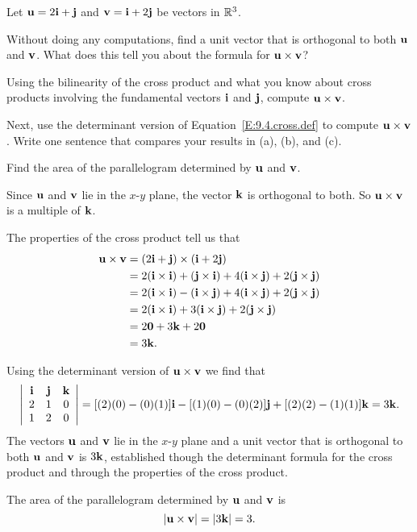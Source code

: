 \begin{exercises} 

\item \label{Ez:9.4.1}    Let $\mathbf{u} = 2\mathbf{i} + \mathbf{j}$ and $\mathbf{v} = \mathbf{i} + 2\mathbf{j}$ be vectors in $\mathbb{R}^3$.
    \ba
	    \item Without doing any computations, find a unit vector that is orthogonal to both $\mathbf{u}$ and $\mathbf{v}$.  What does this tell you about the formula for $\mathbf{u} \times \mathbf{v}$?
	    \item Using the bilinearity of the cross product and what you know about cross products involving the fundamental vectors $\mathbf{i}$ and $\mathbf{j}$, compute $\mathbf{u} \times \mathbf{v}$.
	    \item Next, use the determinant version of Equation~\eqref{E:9.4.cross.def} to compute $\mathbf{u} \times \mathbf{v}$.  Write one sentence that compares your results in (a), (b), and (c).
	    \item Find the area of the parallelogram determined by $\mathbf{u}$ and $\mathbf{v}$.
    \ea

\begin{exerciseSolution}
    \ba
	    \item Since $\mathbf{u}$ and $\mathbf{v}$ lie in the $x$-$y$ plane, the vector $\mathbf{k}$ is orthogonal to both. So $\mathbf{u} \times \mathbf{v}$ is a multiple of $\mathbf{k}$. 
	    \item The properties of the cross product tell us that 
\begin{align*}
\mathbf{u} \times \mathbf{v} &= (2\mathbf{i} + \mathbf{j}) \times (\mathbf{i} + 2\mathbf{j}) \\
	&= 2(\mathbf{i} \times \mathbf{i}) + (\mathbf{j} \times \mathbf{i}) + 4(\mathbf{i} \times \mathbf{j}) + 2(\mathbf{j} \times \mathbf{j}) \\
	&= 2(\mathbf{i} \times \mathbf{i}) - (\mathbf{i} \times \mathbf{j}) + 4(\mathbf{i} \times \mathbf{j}) + 2(\mathbf{j} \times \mathbf{j}) \\
	&= 2(\mathbf{i} \times \mathbf{i})  + 3(\mathbf{i} \times \mathbf{j}) + 2(\mathbf{j} \times \mathbf{j}) \\
	&= 2\mathbf{0} + 3\mathbf{k} + 2\mathbf{0} \\
	&= 3 \mathbf{k}.
\end{align*}
	    \item Using the determinant version of $\mathbf{u} \times \mathbf{v}$ we find that 
\[\left| \begin{array}{ccc} \mathbf{i} & \mathbf{j} & \mathbf{k} \\ 2 & 1 & 0 \\ 1 & 2 & 0 \end{array} \right| = [(2)(0)-(0)(1)]\mathbf{i} - [(1)(0)-(0)(2)] \mathbf{j} + [(2)(2)-(1)(1)] \mathbf{k} = 3 \mathbf{k}.\]
The vectors $\mathbf{u}$ and $\mathbf{v}$ lie in the $x$-$y$ plane and a unit vector that is orthogonal to both $\mathbf{u}$ and $\mathbf{v}$ is $3 \mathbf{k}$, established though the determinant formula for the cross product and through the properties of the cross product. 
	    \item The area of the parallelogram determined by $\mathbf{u}$ and $\mathbf{v}$ is 
	    \[|\mathbf{u} \times \mathbf{v}| = |3\mathbf{k}| = 3.\]
    \ea
\end{exerciseSolution}


\end{exercises}
